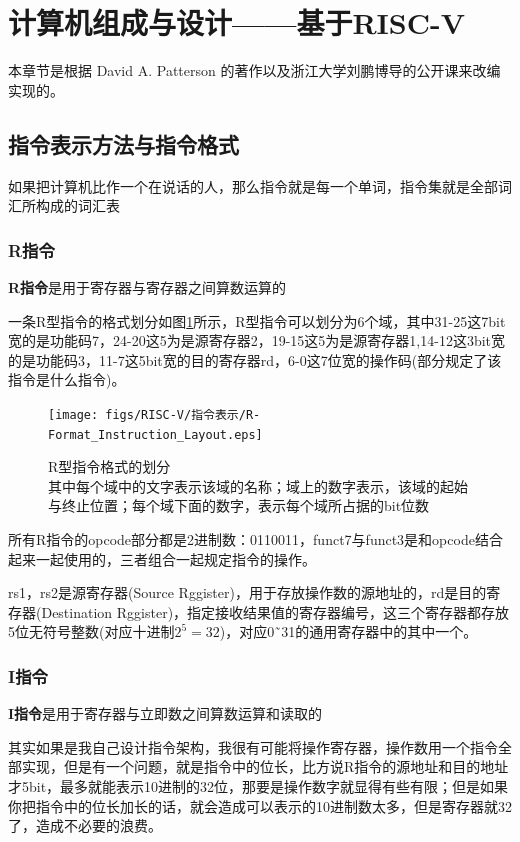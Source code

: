 \section{计算机组成与设计——基于RISC-V}
本章节是根据 David A. Patterson 的著作\cite{Computer_Organization_and_Design_riscv}以及浙江大学刘鹏博导的公开课\cite{Computer_Organization_and_Design_ZJU}来改编实现的。

\subsection{指令表示方法与指令格式}
如果把计算机比作一个在说话的人，那么指令就是每一个单词，指令集就是全部词汇所构成的词汇表

\subsubsection{R指令}
\textbf{R指令}是用于寄存器与寄存器之间算数运算的

一条R型指令的格式划分如图\ref{fig:R-Format_Instruction_Layout}所示，R型指令可以划分为6个域，其中31-25这7bit宽的是功能码7，24-20这5为是源寄存器2，19-15这5为是源寄存器1,14-12这3bit宽的是功能码3，11-7这5bit宽的目的寄存器rd，6-0这7位宽的操作码(部分规定了该指令是什么指令)。

\begin{figure}[htbp]
  \centering %
  \texttt{[image: figs/RISC-V/指令表示/R-Format\_Instruction\_Layout.eps]}
  \caption{R型指令格式的划分\\ 其中每个域中的文字表示该域的名称；域上的数字表示，该域的起始与终止位置；每个域下面的数字，表示每个域所占据的bit位数}
  \label{fig:R-Format_Instruction_Layout} %
\end{figure}
所有R指令的opcode部分都是2进制数：0110011，funct7与funct3是和opcode结合起来一起使用的，三者组合一起规定指令的操作。

rs1，rs2是源寄存器(Source Rggister)，用于存放操作数的源地址的，rd是目的寄存器(Destination Rggister)，指定接收结果值的寄存器编号，这三个寄存器都存放5位无符号整数(对应十进制$2^5=32$)，对应0˜31的通用寄存器中的其中一个。


\subsubsection{I指令}
\textbf{I指令}是用于寄存器与立即数之间算数运算和读取的 

其实如果是我自己设计指令架构，我很有可能将操作寄存器，操作数用一个指令全部实现，但是有一个问题，就是指令中的位长，比方说R指令的源地址和目的地址才5bit，最多就能表示10进制的32位，那要是操作数字就显得有些有限；但是如果你把指令中的位长加长的话，就会造成可以表示的10进制数太多，但是寄存器就32了，造成不必要的浪费。

